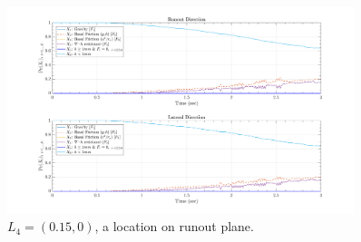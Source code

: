 \documentclass{article}
\begin{document}
\begin{figure}[H]
\centering
	\includegraphics[width=0.9\textwidth]{InclinedPlane/LocalRecords/DominancePr_x4P.png}
	\caption{$L_4=(0.15,0)$, a location on runout plane.}
	\label{fig:Ramp-Prx4P}
\end{figure}
\end{document}
